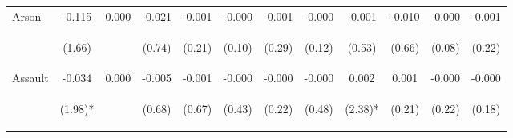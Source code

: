 \begin{tabular}{lccccccccccc}
\noalign{\smallskip}Arson & -0.115 & 0.000 & -0.021 & -0.001 & -0.000 & -0.001 & -0.000 & -0.001 & -0.010 & -0.000 & -0.001\\
 & \begin{footnotesize}(1.66)\end{footnotesize} & \begin{footnotesize}\end{footnotesize} & \begin{footnotesize}(0.74)\end{footnotesize} & \begin{footnotesize}(0.21)\end{footnotesize} & \begin{footnotesize}(0.10)\end{footnotesize} & \begin{footnotesize}(0.29)\end{footnotesize} & \begin{footnotesize}(0.12)\end{footnotesize} & \begin{footnotesize}(0.53)\end{footnotesize} & \begin{footnotesize}(0.66)\end{footnotesize} & \begin{footnotesize}(0.08)\end{footnotesize} & \begin{footnotesize}(0.22)\end{footnotesize}\\
\noalign{\smallskip}Assault & -0.034 & 0.000 & -0.005 & -0.001 & -0.000 & -0.000 & -0.000 & 0.002 & 0.001 & -0.000 & -0.000\\
 & \begin{footnotesize}(1.98)*\end{footnotesize} & \begin{footnotesize}\end{footnotesize} & \begin{footnotesize}(0.68)\end{footnotesize} & \begin{footnotesize}(0.67)\end{footnotesize} & \begin{footnotesize}(0.43)\end{footnotesize} & \begin{footnotesize}(0.22)\end{footnotesize} & \begin{footnotesize}(0.48)\end{footnotesize} & \begin{footnotesize}(2.38)*\end{footnotesize} & \begin{footnotesize}(0.21)\end{footnotesize} & \begin{footnotesize}(0.22)\end{footnotesize} & \begin{footnotesize}(0.18)\end{footnotesize}\\

\end{tabular}
